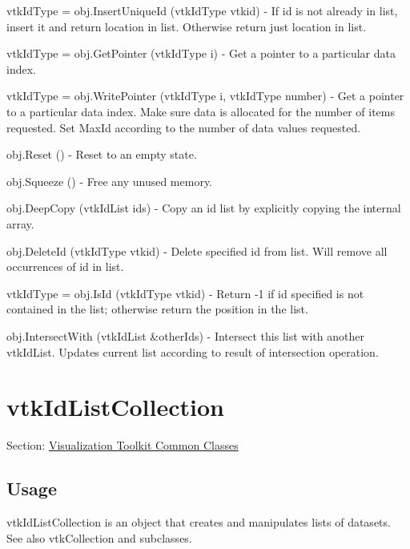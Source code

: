 \begin{DoxyItemize}
\item {\ttfamily vtk\-Id\-Type = obj.\-Insert\-Unique\-Id (vtk\-Id\-Type vtkid)} -\/ If id is not already in list, insert it and return location in list. Otherwise return just location in list.  
\item {\ttfamily vtk\-Id\-Type = obj.\-Get\-Pointer (vtk\-Id\-Type i)} -\/ Get a pointer to a particular data index.  
\item {\ttfamily vtk\-Id\-Type = obj.\-Write\-Pointer (vtk\-Id\-Type i, vtk\-Id\-Type number)} -\/ Get a pointer to a particular data index. Make sure data is allocated for the number of items requested. Set Max\-Id according to the number of data values requested.  
\item {\ttfamily obj.\-Reset ()} -\/ Reset to an empty state.  
\item {\ttfamily obj.\-Squeeze ()} -\/ Free any unused memory.  
\item {\ttfamily obj.\-Deep\-Copy (vtk\-Id\-List ids)} -\/ Copy an id list by explicitly copying the internal array.  
\item {\ttfamily obj.\-Delete\-Id (vtk\-Id\-Type vtkid)} -\/ Delete specified id from list. Will remove all occurrences of id in list.  
\item {\ttfamily vtk\-Id\-Type = obj.\-Is\-Id (vtk\-Id\-Type vtkid)} -\/ Return -\/1 if id specified is not contained in the list; otherwise return the position in the list.  
\item {\ttfamily obj.\-Intersect\-With (vtk\-Id\-List \&other\-Ids)} -\/ Intersect this list with another vtk\-Id\-List. Updates current list according to result of intersection operation.  
\end{DoxyItemize}\hypertarget{vtkcommon_vtkidlistcollection}{}\section{vtk\-Id\-List\-Collection}\label{vtkcommon_vtkidlistcollection}
Section\-: \hyperlink{sec_vtkcommon}{Visualization Toolkit Common Classes} \hypertarget{vtkwidgets_vtkxyplotwidget_Usage}{}\subsection{Usage}\label{vtkwidgets_vtkxyplotwidget_Usage}
vtk\-Id\-List\-Collection is an object that creates and manipulates lists of datasets. See also vtk\-Collection and subclasses.

